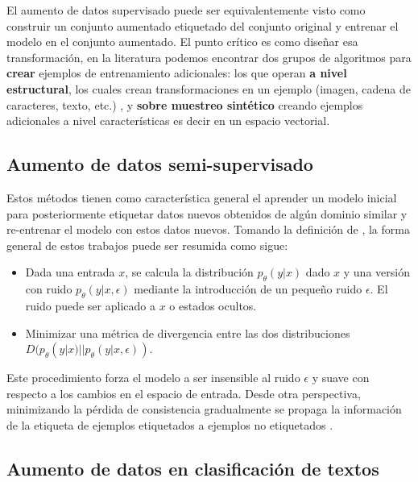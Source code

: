 El aumento de datos supervisado puede ser equivalentemente visto como construir un conjunto aumentado etiquetado del conjunto original y entrenar el modelo en el conjunto aumentado. El punto crítico es como diseñar esa transformación, en la literatura podemos encontrar dos grupos de algoritmos para \textbf{crear} ejemplos de entrenamiento adicionales: los que operan \textbf{a nivel estructural}, los cuales crean transformaciones en un ejemplo (imagen, cadena de caracteres, texto, etc.) \citep{zhong2017random}, y \textbf{sobre muestreo sintético} creando ejemplos adicionales a nivel características es decir en un espacio vectorial\citep{chawla2002smote}. 

\subsection{Aumento de datos semi-supervisado}
Estos métodos tienen como característica general el aprender un modelo inicial para posteriormente etiquetar datos nuevos obtenidos de algún dominio similar y re-entrenar el modelo con estos datos nuevos. Tomando la definición de \citep{xie2019unsupervised}, la forma general de estos trabajos puede ser resumida como sigue:

\begin{itemize}
    \item Dada una entrada $x$, se calcula la distribución $p_\theta (y|x)$ dado $x$ y una versión con ruido $p_\theta (y|x, \epsilon)$ mediante la introducción de un pequeño ruido $\epsilon$. El ruido puede ser aplicado a $x$ o estados ocultos.
    \item Minimizar una métrica de divergencia entre las dos distribuciones $D (p_\theta (y|x) || p_\theta (y|x, \epsilon))$.
\end{itemize}

Este procedimiento forza el modelo a ser insensible al ruido $\epsilon$ y suave con respecto a los cambios en el espacio de entrada. Desde otra perspectiva, minimizando la pérdida de consistencia gradualmente se propaga la información de la etiqueta de ejemplos etiquetados a ejemplos no etiquetados \citep{Miyato2019}.


\subsection{Aumento de datos en clasificación de textos}

